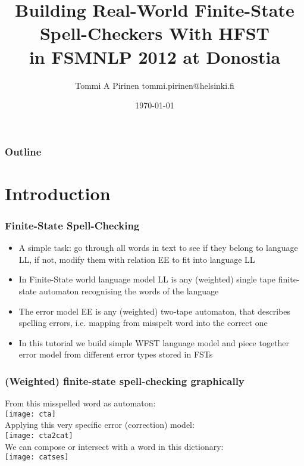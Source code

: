 \documentclass[t,12pt]{beamer}
\title{Building Real-World Finite-State Spell-Checkers With HFST\\
\scriptsize{in FSMNLP 2012 at Donostia}}
\author{Tommi A Pirinen \scriptsize \guilsinglleft{}tommi.pirinen@helsinki.fi\guilsinglright{}}
\institute{University of Helsinki\\Department of Modern Languages}
\date{\today}
\begin{document}

\HyTitle

\begin{frame}
    \frametitle{Outline}
    \tableofcontents
\end{frame}



\section{Introduction}

\begin{frame}
    \frametitle{Finite-State Spell-Checking}
    
    \begin{itemize}
        \item A simple task: go through all words in text to see if they
            belong to language LL, if not, modify them with relation
            EE to fit into language LL
        \item In Finite-State world language model LL is any (weighted) single
            tape finite-state automaton recognising the words of the
            language
        \item The error model EE is any (weighted) two-tape automaton, that
            describes spelling errors, i.e. mapping from misspelt word into
            the correct one
        \item In this tutorial we build simple WFST language model and piece
            together error model from different error types stored in FSTs
    \end{itemize}
\end{frame}

\begin{frame}
    \frametitle{(Weighted) finite-state spell-checking graphically}
    From this misspelled word as automaton:\\
    \texttt{[image: cta]}\\
    Applying this very specific error (correction) model:\\
\texttt{[image: cta2cat]}\\
    We can compose or intersect with a word in this dictionary:\\
\texttt{[image: catses]}\\
\end{frame}
\end{document}
